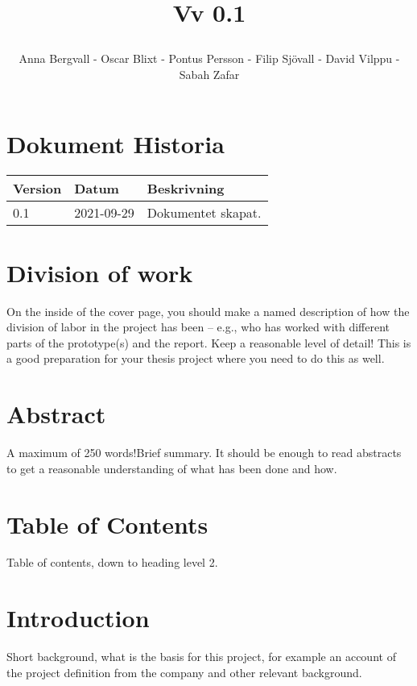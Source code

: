 \documentclass[12pt]{article}
\date {#1}
\title {
    \documentNumber {01}    

    \documentTitle {Helsingborg Event and Convention Bureau}
    
    \documentDate {2021-09-29}
    \documentVersion Vv 0.1
    
    \author{Anna Bergvall - Oscar Blixt - Pontus Persson - Filip Sjövall - David Vilppu - Sabah Zafar}
}
\begin{document}
\maketitle

\thispagestyle{empty}



\newpage

\tableofcontents


\newpage

\section{Dokument Historia}
\begin{tabular}{ l | l | l }
    Version & Datum & Beskrivning \\
    \hline
    0.1 & 2021-09-29 & Dokumentet skapat. \\
    \hline
   
   
\end{tabular}

\newpage

\section{Division of work}
On the inside of the cover page, you should make a named description of how the division of labor in the project has been – e.g., who has worked with different parts of the prototype(s) and the report. Keep a reasonable level of detail! This is a good preparation for your thesis project where you need to do this as well.

\section{Abstract}
A maximum of 250 words!Brief summary. It should be enough to read abstracts to get a reasonable understanding of what has been done and how.

\section{Table of Contents}
Table of contents, down to heading level 2.

\section{Introduction}
Short background, what is the basis for this project, for example an account of the project definition from the company and other relevant background.
\end{document}
